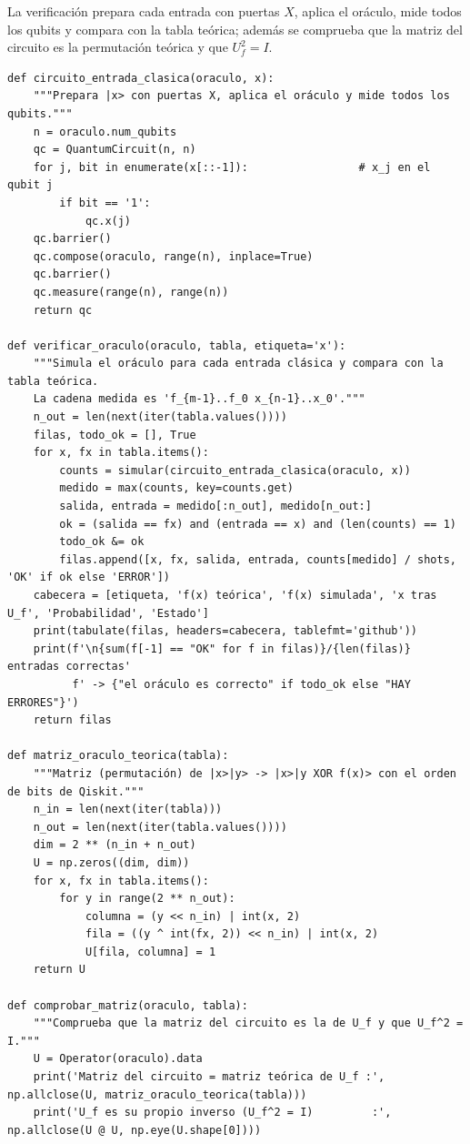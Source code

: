 La verificación prepara cada entrada con puertas $X$, aplica el oráculo, mide todos los qubits y compara con la tabla teórica; además se comprueba que la matriz del circuito es la permutación teórica y que $U_f^2=I$.

\begin{lstlisting}[caption={Verificación del oráculo con entradas clásicas y comprobación matricial.},label={lst:b1_verificacion}]
def circuito_entrada_clasica(oraculo, x):
    """Prepara |x> con puertas X, aplica el oráculo y mide todos los qubits."""
    n = oraculo.num_qubits
    qc = QuantumCircuit(n, n)
    for j, bit in enumerate(x[::-1]):                 # x_j en el qubit j
        if bit == '1':
            qc.x(j)
    qc.barrier()
    qc.compose(oraculo, range(n), inplace=True)
    qc.barrier()
    qc.measure(range(n), range(n))
    return qc

def verificar_oraculo(oraculo, tabla, etiqueta='x'):
    """Simula el oráculo para cada entrada clásica y compara con la tabla teórica.
    La cadena medida es 'f_{m-1}..f_0 x_{n-1}..x_0'."""
    n_out = len(next(iter(tabla.values())))
    filas, todo_ok = [], True
    for x, fx in tabla.items():
        counts = simular(circuito_entrada_clasica(oraculo, x))
        medido = max(counts, key=counts.get)
        salida, entrada = medido[:n_out], medido[n_out:]
        ok = (salida == fx) and (entrada == x) and (len(counts) == 1)
        todo_ok &= ok
        filas.append([x, fx, salida, entrada, counts[medido] / shots, 'OK' if ok else 'ERROR'])
    cabecera = [etiqueta, 'f(x) teórica', 'f(x) simulada', 'x tras U_f', 'Probabilidad', 'Estado']
    print(tabulate(filas, headers=cabecera, tablefmt='github'))
    print(f'\n{sum(f[-1] == "OK" for f in filas)}/{len(filas)} entradas correctas'
          f' -> {"el oráculo es correcto" if todo_ok else "HAY ERRORES"}')
    return filas

def matriz_oraculo_teorica(tabla):
    """Matriz (permutación) de |x>|y> -> |x>|y XOR f(x)> con el orden de bits de Qiskit."""
    n_in = len(next(iter(tabla)))
    n_out = len(next(iter(tabla.values())))
    dim = 2 ** (n_in + n_out)
    U = np.zeros((dim, dim))
    for x, fx in tabla.items():
        for y in range(2 ** n_out):
            columna = (y << n_in) | int(x, 2)
            fila = ((y ^ int(fx, 2)) << n_in) | int(x, 2)
            U[fila, columna] = 1
    return U

def comprobar_matriz(oraculo, tabla):
    """Comprueba que la matriz del circuito es la de U_f y que U_f^2 = I."""
    U = Operator(oraculo).data
    print('Matriz del circuito = matriz teórica de U_f :', np.allclose(U, matriz_oraculo_teorica(tabla)))
    print('U_f es su propio inverso (U_f^2 = I)         :', np.allclose(U @ U, np.eye(U.shape[0])))
\end{lstlisting}

